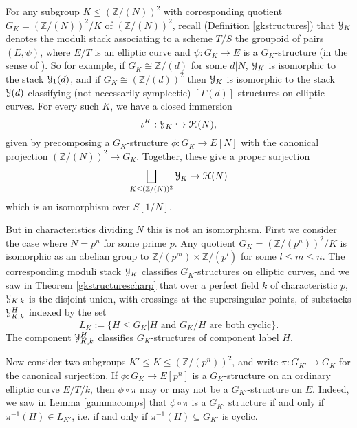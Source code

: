 \documentclass[11pt]{amsart}
\theoremstyle{definition}
\begin{document}
For any subgroup $K \leq (\mathbb{Z}/(N))^2$ with corresponding quotient $G_K = (\mathbb{Z}/(N))^2/K$ of $(\mathbb{Z}/(N))^2$, recall (Definition \ref{gkstructures}) that ${\mathbf{\EuScript{Y}}}_K$ denotes the moduli stack associating to a scheme $T/S$ the groupoid of pairs $(E,\psi)$, where $E/T$ is an elliptic curve and $\psi: G_K \rightarrow E$ is a $G_K$-structure (in the sense of \cite[\S1.5]{KM1}). So for example, if $G_K \cong \mathbb{Z}/(d)$ for some $d|N$, ${\mathbf{\EuScript{Y}}}_K$ is isomorphic to the stack ${\mathbf{\EuScript{Y}}}_1(d)$, and if $G_K \cong (\mathbb{Z}/(d))^2$ then ${\mathbf{\EuScript{Y}}}_K$ is isomorphic to the stack ${\mathbf{\EuScript{Y}}}(d)$ classifying (not necessarily symplectic) $[\Gamma(d)]$-structures on elliptic curves. For every such $K$, we have a closed immersion 
\begin{displaymath}
\iota^K: {\mathbf{\EuScript{Y}}}_K  \hookrightarrow {\mathbf{\EuScript{H}}}(N), 
\end{displaymath}
given by precomposing a $G_K$-structure $\phi:G_K \rightarrow E[N]$ with the canonical projection $(\mathbb{Z}/(N))^2 \rightarrow G_K$. Together, these give a proper surjection 
\begin{displaymath}
\bigsqcup_{K \leq (\mathbb{Z}/(N))^2} {\mathbf{\EuScript{Y}}}_K \rightarrow {\mathbf{\EuScript{H}}}(N)
\end{displaymath}
which is an isomorphism over $S[1/N]$.

But in characteristics dividing $N$ this is not an isomorphism. First we consider the case where $N=p^n$ for some prime $p$. Any quotient $G_K = (\mathbb{Z}/(p^n))^2/K$ is isomorphic as an abelian group to $\mathbb{Z}/(p^m) \times \mathbb{Z}/(p^l)$ for some $l\leq m\leq n$. The corresponding moduli stack ${\mathbf{\EuScript{Y}}}_K$ classifies $G_K$-structures on elliptic curves, and we saw in Theorem \ref{gkstructurescharp} that over a perfect field $k$ of characteristic $p$, ${\mathbf{\EuScript{Y}}}_{K,k}$ is the disjoint union, with crossings at the supersingular points, of substacks ${\mathbf{\EuScript{Y}}}^H_{K,k}$ indexed by the set 
\begin{displaymath}
L_K := \{H \leq G_K|\textrm{$H$ and $G_K/H$ are both cyclic}\}.
\end{displaymath}
The component ${\mathbf{\EuScript{Y}}}^H_{K,k}$ classifies $G_K$-structures of component label $H$.

Now consider two subgroups $K' \leq K \leq (\mathbb{Z}/(p^n))^2$, and write $\pi: G_{K'} \rightarrow G_K$ for the canonical surjection. If $\phi:G_K \rightarrow E[p^n]$ is a $G_K$-structure on an ordinary elliptic curve $E/T/k$, then $\phi \circ \pi$ may or may not be a $G_{K'}$-structure on $E$. Indeed, we saw in Lemma \ref{gammacomps} that $\phi \circ \pi$ is a $G_{K'}$ structure if and only if $\pi^{-1}(H) \in L_{K'}$, i.e. if and only if $\pi^{-1}(H) \subseteq G_{K'}$ is cyclic.
\end{document}
